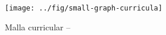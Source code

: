 \documentclass[a4paper,10pt]{book}
\begin{document}


\begin{landscape}
\begin{figure}
	\texttt{[image: ../fig/small-graph-curricula]}
	\label{fig:malla-curricular}
	\caption{Malla curricular \SchoolFullName -- \siglas}
\end{figure}
\end{landscape}
\end{document}
